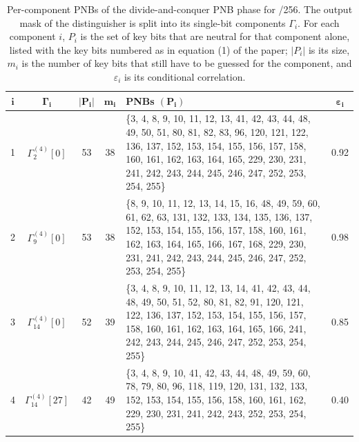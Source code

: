 \begin{table}[!htbp]
\centering
\renewcommand{\arraystretch}{1.6}
\setlength{\tabcolsep}{8pt}
\caption{Per-component PNBs of the divide-and-conquer PNB phase for /256. The output mask of the distinguisher is split into its single-bit components $\Gamma_i$. For each component $i$, $P_i$ is the set of key bits that are neutral for that component alone, listed with the key bits numbered as in equation (1) of the paper; $|P_i|$ is its size, $m_i$ is the number of key bits that still have to be guessed for the component, and $\varepsilon_i$ is its conditional correlation.}
\label{app:pnbtab-6}
\begin{tabular}{@{}cccc p{8cm} c@{}}
\toprule
$\boldsymbol{i}$ & $\boldsymbol{\Gamma_i}$ & $\boldsymbol{|P_i|}$ & $\boldsymbol{m_i}$ & \textbf{PNBs $(\boldsymbol{P_i})$} & $\boldsymbol{\varepsilon_i}$ \\
\midrule
1 & $\Gamma^{(4)}_{2}[0]$ & 53 & 38 &
\{3, 4, 8, 9, 10, 11, 12, 13, 41, 42, 43, 44, 48, 49, 50, 51, 80, 81, 82, 83, 96, 120, 121, 122, 136, 137, 152, 153, 154, 155, 156, 157, 158, 160, 161, 162, 163, 164, 165, 229, 230, 231, 241, 242, 243, 244, 245, 246, 247, 252, 253, 254, 255\} & 0.92 \\
\midrule
2 & $\Gamma^{(4)}_{9}[0]$ & 53 & 38 &
\{8, 9, 10, 11, 12, 13, 14, 15, 16, 48, 49, 59, 60, 61, 62, 63, 131, 132, 133, 134, 135, 136, 137, 152, 153, 154, 155, 156, 157, 158, 160, 161, 162, 163, 164, 165, 166, 167, 168, 229, 230, 231, 241, 242, 243, 244, 245, 246, 247, 252, 253, 254, 255\} & 0.98 \\
\midrule
3 & $\Gamma^{(4)}_{14}[0]$ & 52 & 39 &
\{3, 4, 8, 9, 10, 11, 12, 13, 14, 41, 42, 43, 44, 48, 49, 50, 51, 52, 80, 81, 82, 91, 120, 121, 122, 136, 137, 152, 153, 154, 155, 156, 157, 158, 160, 161, 162, 163, 164, 165, 166, 241, 242, 243, 244, 245, 246, 247, 252, 253, 254, 255\} & 0.85 \\
\midrule
4 & $\Gamma^{(4)}_{14}[27]$ & 42 & 49 &
\{3, 4, 8, 9, 10, 41, 42, 43, 44, 48, 49, 59, 60, 78, 79, 80, 96, 118, 119, 120, 131, 132, 133, 152, 153, 154, 155, 156, 158, 160, 161, 162, 229, 230, 231, 241, 242, 243, 252, 253, 254, 255\} & 0.40 \\
\bottomrule
\end{tabular}
\end{table}
